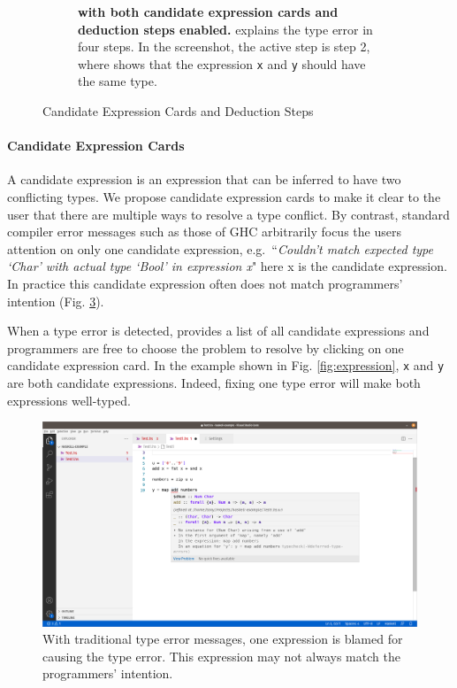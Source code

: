 \begin{figure}
\begin{subfigure}[b]{\linewidth}
        \caption{
            \textbf{\chameleon{} with both candidate expression cards and deduction steps
            enabled.}
            \chameleon{} explains the type error in four steps. In the screenshot, the active step is step 2, where \chameleon{} shows that the expression \texttt{x} and \texttt{y} should have the same type. 
        }
        \label{fig:deduction}
    \end{subfigure}
    \hfill
    \caption{ Candidate Expression Cards and Deduction Steps}
\end{figure}


\paragraph{Candidate Expression Cards}  \label{sub:candidate-expression}

A candidate expression is an expression that can be inferred to have two conflicting types. 
We propose candidate expression cards to make it clear to the user that there are multiple ways to resolve a type conflict. By contrast,  standard compiler error messages such as those of GHC arbitrarily focus the users attention on only one candidate expression, e.g.\ ``\textit{Couldn't match expected type ‘Char’ with actual type ‘Bool’ in expression x}" here x is the candidate expression. In practice this candidate expression often does not match programmers' intention (Fig. \ref{fig:single-candidate}).  

When a type error is detected, \chameleon{} provides a list of all candidate expressions and programmers are free to choose the problem to resolve by clicking on one candidate expression card. In the example shown in Fig. \ref{fig:expression}, \texttt{x} and \texttt{y} are both candidate expressions. Indeed, fixing one type error will make both expressions well-typed.


\begin{figure}[h]
    \centering
    \includegraphics[width=\linewidth]{images/single-error-location-example.png}
    \caption{
With traditional type error messages, one expression is blamed for causing the type error. This expression may not always match the programmers' intention. 
    }
    \label{fig:single-candidate}
\end{figure}

